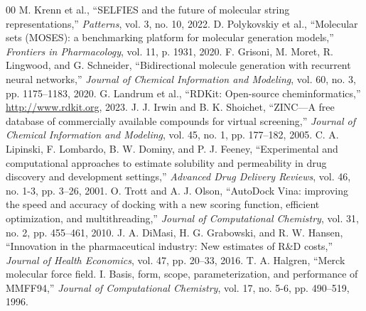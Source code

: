 \documentclass[conference]{IEEEtran}
\begin{document}
\begin{thebibliography}{00}
 M. Krenn et al., ``SELFIES and the future of molecular string representations,'' \textit{Patterns}, vol. 3, no. 10, 2022.
 D. Polykovskiy et al., ``Molecular sets (MOSES): a benchmarking platform for molecular generation models,'' \textit{Frontiers in Pharmacology}, vol. 11, p. 1931, 2020.
 F. Grisoni, M. Moret, R. Lingwood, and G. Schneider, ``Bidirectional molecule generation with recurrent neural networks,'' \textit{Journal of Chemical Information and Modeling}, vol. 60, no. 3, pp. 1175--1183, 2020.
 G. Landrum et al., ``RDKit: Open-source cheminformatics,'' \url{http://www.rdkit.org}, 2023.
 J. J. Irwin and B. K. Shoichet, ``ZINC---A free database of commercially available compounds for virtual screening,'' \textit{Journal of Chemical Information and Modeling}, vol. 45, no. 1, pp. 177--182, 2005.
 C. A. Lipinski, F. Lombardo, B. W. Dominy, and P. J. Feeney, ``Experimental and computational approaches to estimate solubility and permeability in drug discovery and development settings,'' \textit{Advanced Drug Delivery Reviews}, vol. 46, no. 1-3, pp. 3--26, 2001.
 O. Trott and A. J. Olson, ``AutoDock Vina: improving the speed and accuracy of docking with a new scoring function, efficient optimization, and multithreading,'' \textit{Journal of Computational Chemistry}, vol. 31, no. 2, pp. 455--461, 2010.
 J. A. DiMasi, H. G. Grabowski, and R. W. Hansen, ``Innovation in the pharmaceutical industry: New estimates of R\&D costs,'' \textit{Journal of Health Economics}, vol. 47, pp. 20--33, 2016.
 T. A. Halgren, ``Merck molecular force field. I. Basis, form, scope, parameterization, and performance of MMFF94,'' \textit{Journal of Computational Chemistry}, vol. 17, no. 5-6, pp. 490--519, 1996.
\end{thebibliography}
\end{document}
